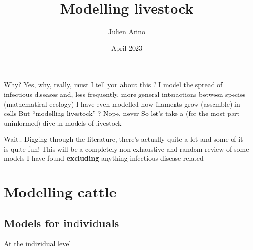 \documentclass[aspectratio=43]{beamer}
\title{Modelling livestock}
\author{Julien Arino}
\date{April 2023}
\begin{document}

\begin{frame}
  \titlepage
\end{frame}
\addtocounter{page}{-1}


\begin{frame}
    \tableofcontents[hideallsubsections]
\end{frame}
\addtocounter{page}{-1}



\begin{frame}{Why?}
    Yes, why, really, must I tell you about this ?
    \vfill
    I model the spread of infectious diseases and, less frequently, more general interactions between species (mathematical ecology)
    \vfill
    I have even modelled how filaments grow (assemble) in cells
    \vfill
    But ``modelling livestock'' ? Nope, never
    \vfill
    So let's take a (for the most part uninformed) dive in models of livestock
\end{frame}

\begin{frame}{Wait..}
    Digging through the literature, there's actually quite a lot and some of it is quite fun!
    \vfill
    This will be a completely non-exhaustive and random review of some models I have found \textbf{excluding} anything infectious disease related
\end{frame}

\section{Modelling cattle}

\subsection{Models for individuals}

\begin{frame}{At the individual level}
    \begin{center}
    \end{center}
\end{frame}
\end{document}
